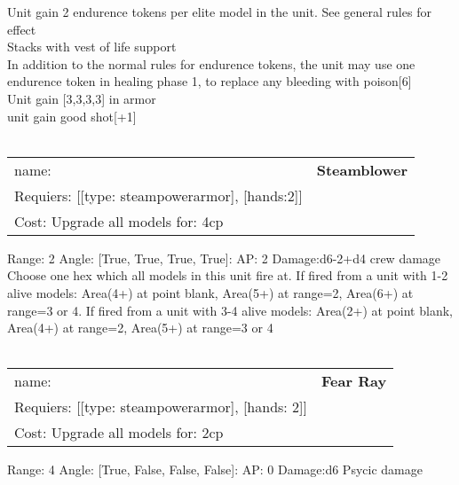 Unit gain 2 endurence tokens per elite model in the unit. See general rules for effect\\ 
Stacks with vest of life support\\ 
In addition to the normal rules for endurence tokens, the unit may use one endurence token in healing phase 1, to replace any bleeding with poison[6]\\ 
Unit gain [3,3,3,3] in armor\\ 
unit gain good shot[+1]\\ 









\ \\
\begin{tabular}{ll}
name: & {\bf Steamblower } \\
Requiers: [[type: steampowerarmor], [hands:2]] \\
Cost: Upgrade all models for: 4cp \\
\end{tabular}



Range: 2  Angle: [True, True, True, True]: AP: 2 Damage:d6-2+d4 crew damage \\
Choose one hex which all models in this unit fire at. If fired from a unit with 1-2 alive models: Area(4+) at point blank, Area(5+) at range=2, Area(6+) at range=3 or 4. If fired from a unit with 3-4 alive models: Area(2+) at point blank, Area(4+) at range=2, Area(5+) at range=3 or 4\\ 








\ \\
\begin{tabular}{ll}
name: & {\bf Fear Ray } \\
Requiers: [[type: steampowerarmor], [hands: 2]] \\
Cost: Upgrade all models for: 2cp \\
\end{tabular}



Range: 4  Angle: [True, False, False, False]: AP: 0 Damage:d6 Psycic damage \\









